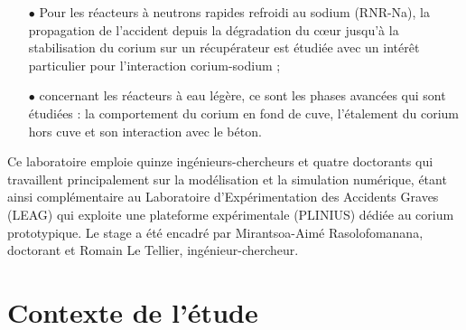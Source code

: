\begin{itemize}
	\item[$\bullet$] Pour les réacteurs à neutrons rapides refroidi au sodium (RNR-Na), la propagation de l'accident depuis la dégradation du c\oe ur jusqu'à la stabilisation du corium sur un récupérateur est étudiée avec un intérêt particulier pour l'interaction corium-sodium ; 
	\item[$\bullet$] concernant les réacteurs à eau légère, ce sont les phases avancées qui sont étudiées : la comportement du corium en fond de cuve, l'étalement du corium hors cuve et son interaction avec le béton.
\end{itemize}
Ce laboratoire emploie quinze ingénieurs-chercheurs et quatre doctorants qui travaillent principalement sur la modélisation et la simulation numérique, étant ainsi complémentaire au Laboratoire d'Expérimentation des Accidents Graves (LEAG) qui exploite une plateforme expérimentale (PLINIUS) dédiée au corium prototypique. Le stage a été encadré par Mirantsoa-Aimé Rasolofomanana, doctorant et Romain Le Tellier, ingénieur-chercheur.

\section{Contexte de l'étude}
